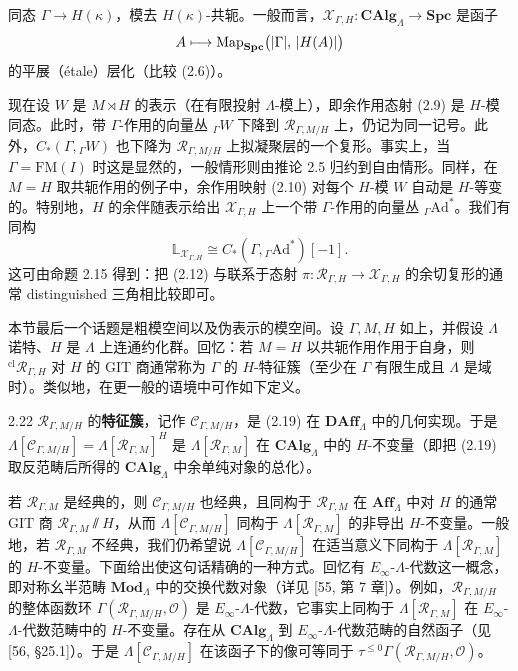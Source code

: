 
同态 $\Gamma \to H(\kappa)$，模去 $H(\kappa)$-共轭。一般而言，$\mathcal X_{\Gamma,H}\colon \mathbf{CAlg}_\Lambda \to \mathbf{Spc}$ 是函子
\[
A \longmapsto \operatorname{Map}_{\mathbf{Spc}}\bigl(|\Gamma|,\, |H(A)|\bigr)
\]
的平展（étale）层化（比较 (2.6)）。

现在设 $W$ 是 $M \rtimes H$ 的表示（在有限投射 $\Lambda$-模上），即余作用态射 (2.9) 是 $H$-模同态。此时，带 $\Gamma$-作用的向量丛 ${}_\Gamma W$ 下降到 $\mathcal R_{\Gamma,M/H}$ 上，仍记为同一记号。此外，$C_*(\Gamma, {}_\Gamma W)$ 也下降为 $\mathcal R_{\Gamma,M/H}$ 上拟凝聚层的一个复形。事实上，当 $\Gamma = \mathrm{FM}(I)$ 时这是显然的，一般情形则由推论 2.5 归约到自由情形。同样，在 $M = H$ 取共轭作用的例子中，余作用映射 (2.10) 对每个 $H$-模 $W$ 自动是 $H$-等变的。特别地，$H$ 的余伴随表示给出 $\mathcal X_{\Gamma,H}$ 上一个带 $\Gamma$-作用的向量丛 ${}_\Gamma \mathrm{Ad}^*$。我们有同构
\[
\mathbb L_{\mathcal X_{\Gamma,H}} \cong C_*(\Gamma, {}_\Gamma \mathrm{Ad}^*)[-1].
\]
这可由命题 2.15 得到：把 (2.12) 与联系于态射 $\pi\colon \mathcal R_{\Gamma,H} \to \mathcal X_{\Gamma,H}$ 的余切复形的通常 distinguished 三角相比较即可。

本节最后一个话题是粗模空间以及伪表示的模空间。设 $\Gamma, M, H$ 如上，并假设 $\Lambda$ 诺特、$H$ 是 $\Lambda$ 上连通约化群。回忆：若 $M = H$ 以共轭作用作用于自身，则 ${}^{\mathrm{cl}}\mathcal R_{\Gamma,H}$ 对 $H$ 的 GIT 商通常称为 $\Gamma$ 的 $H$-特征簇（至少在 $\Gamma$ 有限生成且 $\Lambda$ 是域时）。类似地，在更一般的语境中可作如下定义。

\begin{defn}{2.22}
$\mathcal R_{\Gamma,M/H}$ 的\textbf{特征簇}，记作 $\mathcal C_{\Gamma,M/H}$，是 (2.19) 在 $\mathbf{DAff}_\Lambda$ 中的几何实现。于是 $\Lambda[\mathcal C_{\Gamma,M/H}] = \Lambda[\mathcal R_{\Gamma,M}]^H$ 是 $\Lambda[\mathcal R_{\Gamma,M}]$ 在 $\mathbf{CAlg}_\Lambda$ 中的 $H$-不变量（即把 (2.19) 取反范畴后所得的 $\mathbf{CAlg}_\Lambda$ 中余单纯对象的总化）。
\label{def:zhu2-2-22}
\end{defn}

若 $\mathcal R_{\Gamma,M}$ 是经典的，则 $\mathcal C_{\Gamma,M/H}$ 也经典，且同构于 $\mathcal R_{\Gamma,M}$ 在 $\mathbf{Aff}_\Lambda$ 中对 $H$ 的通常 GIT 商 $\mathcal R_{\Gamma,M}\sslash H$，从而 $\Lambda[\mathcal C_{\Gamma,M/H}]$ 同构于 $\Lambda[\mathcal R_{\Gamma,M}]$ 的非导出 $H$-不变量。一般地，若 $\mathcal R_{\Gamma,M}$ 不经典，我们仍希望说 $\Lambda[\mathcal C_{\Gamma,M/H}]$ 在适当意义下同构于 $\Lambda[\mathcal R_{\Gamma,M}]$ 的 $H$-不变量。下面给出使这句话精确的一种方式。回忆有 $E_\infty$-$\Lambda$-代数这一概念，即对称幺半范畴 $\mathbf{Mod}_\Lambda$ 中的交换代数对象（详见 [55, 第 7 章]）。例如，$\mathcal R_{\Gamma,M/H}$ 的整体函数环 $\Gamma(\mathcal R_{\Gamma,M/H}, \mathcal O)$ 是 $E_\infty$-$\Lambda$-代数，它事实上同构于 $\Lambda[\mathcal R_{\Gamma,M}]$ 在 $E_\infty$-$\Lambda$-代数范畴中的 $H$-不变量。存在从 $\mathbf{CAlg}_\Lambda$ 到 $E_\infty$-$\Lambda$-代数范畴的自然函子（见 [56, §25.1]）。于是 $\Lambda[\mathcal C_{\Gamma,M/H}]$ 在该函子下的像可等同于 $\tau^{\le 0}\Gamma(\mathcal R_{\Gamma,M/H}, \mathcal O)$。

